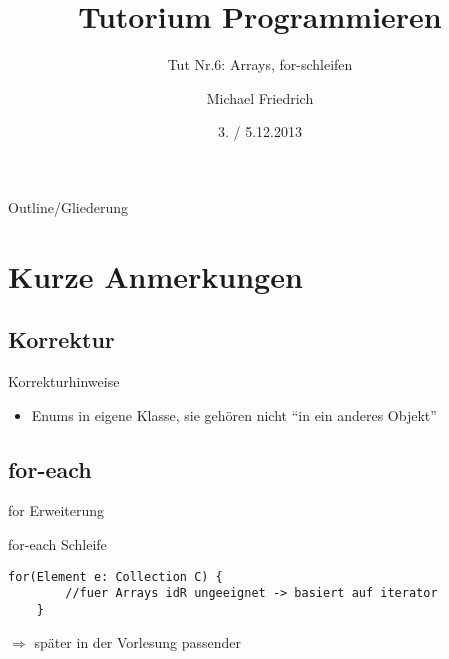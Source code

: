 \documentclass[18pt]{beamer}
\title[Prog Tut Nr. 6]{Tutorium Programmieren}
\subtitle{Tut Nr.6: Arrays, for-schleifen}
\author{Michael Friedrich}
\date{3. / 5.12.2013}
\institute{Institut f\"ur theoretische Informatik}
\begin{document}

\begin{frame}
	\titlepage
\end{frame}

\begin{frame}{Outline/Gliederung}
	\tableofcontents
\end{frame}

\section{Kurze Anmerkungen}
\subsection{Korrektur}
\begin{frame}[fragile]{Korrekturhinweise}
\begin{itemize}
\item Enums in eigene Klasse, sie gehören nicht "`in ein anderes Objekt"'
\end{itemize}
\end{frame}

\subsection{for-each}
\begin{frame}[fragile]{for Erweiterung}
\begin{exampleblock}{for-each Schleife}
\begin{lstlisting}[basicstyle=\scriptsize]
	for(Element e: Collection C) {
		//fuer Arrays idR ungeeignet -> basiert auf iterator
	}
	\end{lstlisting}
\end{exampleblock}
\vspace{1cm}
$\Rightarrow$ später in der Vorlesung passender
\end{frame}
\end{document}

